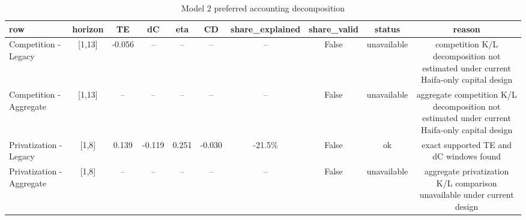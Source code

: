 \begin{table}[!htbp]
  \centering
  \caption{Model 2 preferred accounting decomposition}
  \label{tab:model2\_preferred\_accounting}
  \scriptsize
  \begin{tabular}{lccccccccc}
    \toprule
    row & horizon & TE & dC & eta & CD & share\_explained & share\_valid & status & reason \\
    \midrule
    Competition - Legacy & [1,13] & -0.056 & -- & -- & -- & -- & False & unavailable & competition K/L decomposition not estimated under current Haifa-only capital design \\
    Competition - Aggregate & [1,13] & -- & -- & -- & -- & -- & False & unavailable & aggregate competition K/L decomposition not estimated under current Haifa-only capital design \\
    Privatization - Legacy & [1,8] & 0.139 & -0.119 & 0.251 & -0.030 & -21.5\% & False & ok & exact supported TE and dC windows found \\
    Privatization - Aggregate & [1,8] & -- & -- & -- & -- & -- & False & unavailable & aggregate privatization K/L comparison unavailable under current design \\
    \bottomrule
  \end{tabular}
\end{table}
